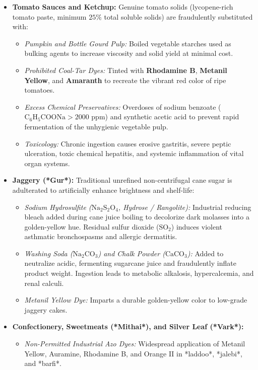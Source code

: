 \documentclass[11pt,a4paper,oneside]{article}
\begin{document}
\begin{itemize}[leftmargin=*]
    \item \textbf{Tomato Sauces and Ketchup:} Genuine tomato solids (lycopene-rich tomato paste, minimum $25\%$ total soluble solids) are fraudulently substituted with:
    \begin{itemize}
        \item \textit{Pumpkin and Bottle Gourd Pulp:} Boiled vegetable starches used as bulking agents to increase viscosity and solid yield at minimal cost.
        \item \textit{Prohibited Coal-Tar Dyes:} Tinted with \textbf{Rhodamine B}, \textbf{Metanil Yellow}, and \textbf{Amaranth} to recreate the vibrant red color of ripe tomatoes.
        \item \textit{Excess Chemical Preservatives:} Overdoses of sodium benzoate ($\mathrm{C_6H_5COONa} > 2000\text{ ppm}$) and synthetic acetic acid to prevent rapid fermentation of the unhygienic vegetable pulp.
        \item \textit{Toxicology:} Chronic ingestion causes erosive gastritis, severe peptic ulceration, toxic chemical hepatitis, and systemic inflammation of vital organ systems.
    \end{itemize}
    \item \textbf{Jaggery (*Gur*):} Traditional unrefined non-centrifugal cane sugar is adulterated to artificially enhance brightness and shelf-life:
    \begin{itemize}
        \item \textit{Sodium Hydrosulfite ($\mathrm{Na_2S_2O_4}$, Hydrose / Rangolite):} Industrial reducing bleach added during cane juice boiling to decolorize dark molasses into a golden-yellow hue. Residual sulfur dioxide ($\mathrm{SO_2}$) induces violent asthmatic bronchospasms and allergic dermatitis.
        \item \textit{Washing Soda ($\mathrm{Na_2CO_3}$) and Chalk Powder ($\mathrm{CaCO_3}$):} Added to neutralize acidic, fermenting sugarcane juice and fraudulently inflate product weight. Ingestion leads to metabolic alkalosis, hypercalcemia, and renal calculi.
        \item \textit{Metanil Yellow Dye:} Imparts a durable golden-yellow color to low-grade jaggery cakes.
    \end{itemize}
    \item \textbf{Confectionery, Sweetmeats (*Mithai*), and Silver Leaf (*Vark*):}
    \begin{itemize}
        \item \textit{Non-Permitted Industrial Azo Dyes:} Widespread application of Metanil Yellow, Auramine, Rhodamine B, and Orange II in *laddoo*, *jalebi*, and *barfi*.

\end{itemize}
\end{itemize}
\end{document}

